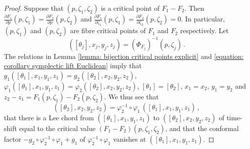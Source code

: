 \documentclass{amsart}
\theoremstyle{remark}
\begin{document}
\begin{proof}
Suppose that $(p, \zeta_1, \zeta_2)$
is a critical point of $F_1 - F_2$.
Then 
$\frac{\partial F_1}{\partial p} (p, \zeta_1)
= \frac{\partial F_2}{\partial p} (p, \zeta_2)$ and $\frac{\partial F_1}{\partial \zeta_1} (p, \zeta_1)
= \frac{\partial F_2}{\partial \zeta_2} (p, \zeta_2) = 0$.
In particular, $(p, \zeta_1)$ and $(p, \zeta_2)$
are fibre critical points of $F_1$ and $F_2$ respectively.
Let
$$
([\theta_j], x_j, y_j, z_j) = (\Phi_{F_j})^{-1} (p, \zeta_j) \,.
$$
The relations in Lemma \ref{lemma: bijection critical points explicit}
and \eqref{equation: corollary symplectic lift Euclidean}
imply that $g_1 ([\theta_1], x_1, y_1, z_1) = g_2 ([\theta_2], x_2, y_2, z_2)$,
$\varphi_1 ([\theta_1], x_1, y_1, z_1) = \varphi_2 ([\theta_2], x_2, y_2, z_2)$,
$[\theta_1] = [\theta_2]$,
$x_1 = x_2$, $y_1 = y_2$
and $z_2 - z_1 = F_1 (p, \zeta_1) - F_2 (p, \zeta_2)$.
We thus see that
\[
([\theta_2], x_2, y_2, z_2)
= \varphi_2^{-1} \circ \varphi_1 \, ([\theta_1], x_1, y_1, z_1) \,,
\]
that there is a Lee chord
from $([\theta_1], x_1, y_1, z_1)$ to $([\theta_2], x_2, y_2, z_2)$
of time-shift equal to the critical value
$(F_1 - F_2) (p, \zeta_1, \zeta_2)$,
and that the conformal factor $- g_2 \circ \varphi_2^{-1} \circ \varphi_1 + g_1$
of $\varphi_2^{-1} \circ \varphi_1$ vanishes at $([\theta_1], x_1, y_1, z_1)$.

\end{proof}
\end{document}
